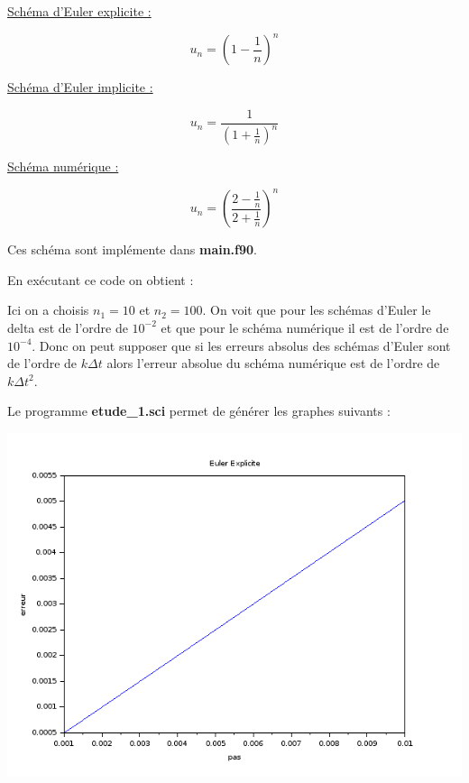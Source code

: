 \documentclass[12pt, letterpaper]{article}
\begin{document}
\begin{enumerate}
  \underline{Schéma d'Euler explicite :}

  \begin{equation*}
    u_n = \left( 1 - \frac{1}{n} \right)^n
  \end{equation*}

  \underline{Schéma d'Euler implicite :}

  \begin{equation*}
    u_n = \frac{1}{\left( 1 + \frac{1}{n} \right)^n}
  \end{equation*}

  \underline{Schéma numérique :}

  \begin{equation*}
    u_n = \left( \frac{2 - \frac{1}{n}}{2 + \frac{1}{n}} \right)^n
  \end{equation*}

  Ces schéma sont implémente dans \textbf{main.f90}.

  \newpage

  

  En exécutant ce code on obtient :

  

  Ici on a choisis $n_1 = 10$ et $n_2 = 100$. On voit que pour les
  schémas d'Euler le delta est de l'ordre de $10^{-2}$ et que pour le
  schéma numérique il est de l'ordre de $10^{-4}$.\newline
  Donc on peut supposer que si les erreurs absolus des schémas
  d'Euler sont de l'ordre de $k \Delta t$ alors l'erreur absolue du
  schéma numérique est de l'ordre de $k \Delta t^2$.


  Le programme \textbf{etude\_1.sci} permet de générer les graphes
  suivants :

  \includegraphics[scale = 0.6]{img/etude_1_ee.png}


\end{enumerate}
\end{document}
